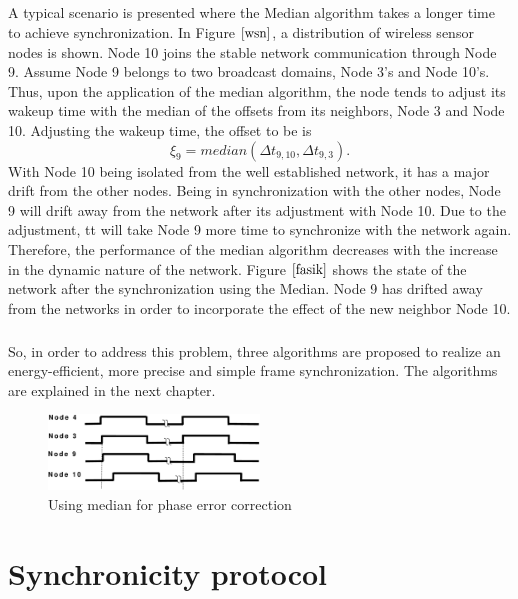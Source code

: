 \documentclass[a4paper,10pt]{report}
\begin{document}
\paragraph*{} A typical scenario is presented where the Median algorithm takes a
longer time to achieve synchronization. In Figure $\ref{wsn}$, a
distribution of wireless sensor nodes is shown. Node 10 joins the
stable network communication through Node 9. Assume Node 9 belongs
to two broadcast domains, Node 3's and Node 10's. Thus, upon the
application of the median algorithm, the node tends to adjust its
wakeup time with the median of the offsets from its neighbors, Node
3 and Node 10. Adjusting the wakeup time, the offset to be is
\begin{equation}
\xi_9 = median(\Delta t_{9,10} , \Delta t_{9,3}).
\end{equation}
With Node 10 being isolated from the well established network, it
has a major drift from the other nodes. Being in synchronization
with the other nodes, Node 9 will drift away from the network after
its adjustment with Node 10. Due to the adjustment, tt will take
Node 9 more time to synchronize with the network again. Therefore,
the performance of the median algorithm decreases with the increase
in the dynamic nature of the network. Figure $\ref{fasik}$ shows the
state of the network after the synchronization using the Median.
Node 9 has drifted away from the networks in order to incorporate
the effect of the new neighbor Node 10.
\paragraph*{}
So, in order to address this problem, three algorithms are proposed
to realize an energy-efficient, more precise and simple frame
synchronization. The algorithms are explained in the next chapter.
\begin{figure}[!h]
\centering
\includegraphics[width= 0.5\textwidth]{offsetpic}
\caption{Using median for phase error correction} \label{fasik}
\end{figure}
\chapter{\textbf{Synchronicity protocol}}
\end{document}

